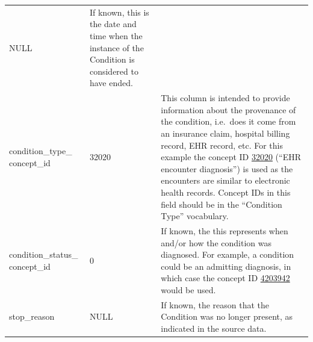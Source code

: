 \documentclass[11pt]{book}
\begin{document}
\begin{longtable}[]{@{}lll@{}}
\begin{minipage}[t]{0.16\columnwidth}
NULL\strut
\end{minipage} & \begin{minipage}[t]{0.48\columnwidth}\raggedright\strut
If known, this is the date and time when the instance of the Condition
is considered to have ended.\strut
\end{minipage}\tabularnewline
\begin{minipage}[t]{0.28\columnwidth}\raggedright\strut
condition\_type\_ concept\_id\strut
\end{minipage} & \begin{minipage}[t]{0.16\columnwidth}\raggedright\strut
32020\strut
\end{minipage} & \begin{minipage}[t]{0.48\columnwidth}\raggedright\strut
This column is intended to provide information about the provenance of
the condition, i.e.~does it come from an insurance claim, hospital
billing record, EHR record, etc. For this example the concept ID
\href{http://athena.ohdsi.org/search-terms/terms/32020}{32020} (``EHR
encounter diagnosis'') is used as the encounters are similar to
electronic health records. Concept IDs in this field should be in the
``Condition Type'' vocabulary.\strut
\end{minipage}\tabularnewline
\begin{minipage}[t]{0.28\columnwidth}\raggedright\strut
condition\_status\_ concept\_id\strut
\end{minipage} & \begin{minipage}[t]{0.16\columnwidth}\raggedright\strut
0\strut
\end{minipage} & \begin{minipage}[t]{0.48\columnwidth}\raggedright\strut
If known, the this represents when and/or how the condition was
diagnosed. For example, a condition could be an admitting diagnosis, in
which case the concept ID
\href{http://athena.ohdsi.org/search-terms/terms/4203942}{4203942} would
be used.\strut
\end{minipage}\tabularnewline
\begin{minipage}[t]{0.28\columnwidth}\raggedright\strut
stop\_reason\strut
\end{minipage} & \begin{minipage}[t]{0.16\columnwidth}\raggedright\strut
NULL\strut
\end{minipage} & \begin{minipage}[t]{0.48\columnwidth}\raggedright\strut
If known, the reason that the Condition was no longer present, as
indicated in the source data.\strut

\end{minipage}
\end{longtable}
\end{document}
